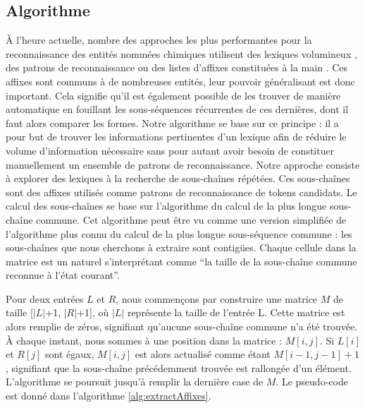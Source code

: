 \documentclass[12pt,a4paper,times,twoside,openright]{report}
\begin{document}
        \subsection{Algorithme}
        \label{subsec:morphology-extraction-algorithm}
À l'heure actuelle, nombre des approches les plus performantes pour la reconnaissance des entités nommées chimiques utilisent des lexiques volumineux \citep{leaman2013ncbi,lowe2014leadmine,chiu2015named}, des patrons de reconnaissance \citep{campos2013chemical,holat2016fouille} ou des listes d'affixes constituées à la main \citep{leaman2013ncbi}. Ces affixes sont communs à de nombreuses entités, leur pouvoir généralisant est donc important. Cela signifie qu'il est également possible de les trouver de manière automatique en fouillant les sous-séquences récurrentes de ces dernières, dont il faut alors comparer les formes. Notre algorithme se base sur ce principe : il a pour but de trouver les informations pertinentes d'un lexique afin de réduire le volume d'information nécessaire sans pour autant avoir besoin de constituer manuellement un ensemble de patrons de reconnaissance. Notre approche consiste à explorer des lexiques à la recherche de sous-chaînes répétées. Ces sous-chaînes sont des affixes utilisés comme patrons de reconnaissance de tokens candidats. Le calcul des sous-chaînes se base sur l'algorithme du calcul de la plus longue sous-chaîne commune. Cet algorithme peut être vu comme une version simplifiée de l'algorithme plus connu du calcul de la plus longue sous-séquence commune : les sous-chaînes que nous cherchons à extraire sont contigües. Chaque cellule dans la matrice est un naturel s'interprétant comme ``la taille de la sous-chaîne commune reconnue à l'état courant''.

Pour deux entrées $L$ et $R$, nous commençons par construire une matrice $M$ de taille [$|L|$+1, $|R|$+1], où $|L|$ représente la taille de l'entrée L. Cette matrice est alors remplie de zéros, signifiant qu'aucune sous-chaîne commune n'a été trouvée. À chaque instant, nous sommes à une position dans la matrice : $M[i,j]$. Si $L[i]$ et $R[j]$ sont égaux, $M[i,j]$ est alors actualisé comme étant $M[i-1,j-1]+1$, signifiant que la sous-chaîne précédemment trouvée est rallongée d'un élément. L'algorithme se poursuit jusqu'à remplir la dernière case de $M$. Le pseudo-code est donné dans l'algorithme \ref{alg:extractAffixes}.
\end{document}
